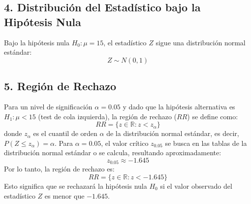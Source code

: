 \documentclass{article}
\begin{document}
\subsection*{4. Distribución del Estadístico bajo la Hipótesis Nula}
Bajo la hipótesis nula $H_0: \mu = 15$, el estadístico $Z$ sigue una distribución normal estándar:
$$ Z \sim N(0, 1) $$

\subsection*{5. Región de Rechazo}
Para un nivel de significación $\alpha = 0.05$ y dado que la hipótesis alternativa es $H_1: \mu < 15$ (test de cola izquierda), la región de rechazo ($RR$) se define como:
$$ RR = \{z \in \mathbb{R} : z < z_\alpha\} $$
donde $z_\alpha$ es el cuantil de orden $\alpha$ de la distribución normal estándar, es decir, $P(Z \le z_\alpha) = \alpha$.
Para $\alpha = 0.05$, el valor crítico $z_{0.05}$ se busca en las tablas de la distribución normal estándar o se calcula, resultando aproximadamente:
$$ z_{0.05} \approx -1.645 $$
Por lo tanto, la región de rechazo es:
$$ RR = \{z \in \mathbb{R} : z < -1.645\} $$
Esto significa que se rechazará la hipótesis nula $H_0$ si el valor observado del estadístico $Z$ es menor que $-1.645$.
\end{document}
